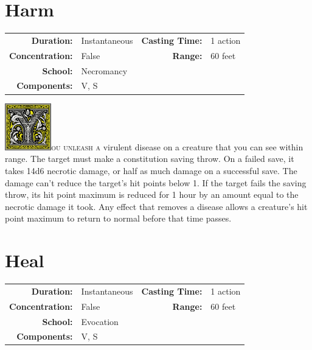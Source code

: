 \documentclass[12pt,showtrims]{memoir}
\begin{document}
\newpage
\section*{Harm}

{
\small\centering\vspace{-6pt}
\begin{tabular}{rlrl}
\toprule

\textbf{Duration:} & Instantaneous &
\textbf{Casting Time:} & 1 action \\
\textbf{Concentration:} & False &
\textbf{Range:} & 60 feet \\
\textbf{School:} & Necromancy \\
\textbf{Components:} & \multicolumn{3}{p{0.7\textwidth}}{V, S}\\

\bottomrule
\end{tabular}
}

\vspace{1\baselineskip}\noindent
\lettrine[lines=4]{\includegraphics[height=58pt]{initials/Y.png}}{ou unleash a} virulent disease on a creature that you can see within range. The target must make a constitution saving throw. On a failed save, it takes 14d6 necrotic damage, or half as much damage on a successful save. The damage can't reduce the target's hit points below 1. If the target fails the saving throw, its hit point maximum is reduced for 1 hour by an amount equal to the necrotic damage it took. Any effect that removes a disease allows a creature's hit point maximum to return to normal before that time passes.

\newpage
\section*{Heal}

{
\small\centering\vspace{-6pt}
\begin{tabular}{rlrl}
\toprule

\textbf{Duration:} & Instantaneous &
\textbf{Casting Time:} & 1 action \\
\textbf{Concentration:} & False &
\textbf{Range:} & 60 feet \\
\textbf{School:} & Evocation \\
\textbf{Components:} & \multicolumn{3}{p{0.7\textwidth}}{V, S}\\

\bottomrule
\end{tabular}
}
\end{document}
